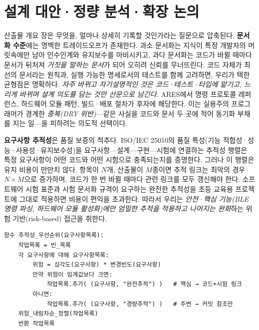 \section{설계 대안·정량 분석·확장 논의}

산출물 개요 장은 무엇을, 얼마나 상세히 기록할 것인가라는 질문으로 압축된다. \textbf{문서화 수준}에는 명백한 트레이드오프가 존재한다. 과소 문서화는 지식이 특정 개발자의 머릿속에만 남아 인수인계와 유지보수를 마비시키고, 과다 문서화는 코드가 바뀔 때마다 문서가 뒤처져 \emph{거짓을 말하는 문서}가 되어 오히려 신뢰를 무너뜨린다\cite{mcconnell2004codecomplete}. 코드 자체가 최선의 문서라는 원칙\cite{martin2008cleancode}과, 실행 가능한 명세로서의 테스트\cite{beck2003tdd}를 함께 고려하면, 우리가 택한 균형점은 명확하다. \emph{자주 바뀌고 자기설명적인 것은 코드·테스트·타입에 맡기고, 느리게 바뀌며 설계 의도를 담는 것만 산문으로 남긴다.} ARES에서 명령 프로토콜 레퍼런스\cite{ares-repo}, 하드웨어 모듈 패턴, 빌드·배포 절차가 후자에 해당한다. 이는 실용주의 프로그래머\cite{hunt1999pragmatic}가 경계한 \emph{중복(DRY 위반)}—같은 사실을 코드와 문서 두 곳에 적어 동기화 부채를 지는 일—을 피하려는 의도적 선택이다.

\textbf{요구사항 추적성}은 품질 보증의 척추다. ISO/IEC 25010\cite{iso25010}의 품질 특성(기능 적합성·성능·사용성·유지보수성)을 요구사항—설계—구현—시험에 연결하는 추적성 행렬은 특정 요구사항이 어떤 코드와 어떤 시험으로 충족되는지를 증명한다. 그러나 이 행렬은 유지 비용이 만만치 않다. 항목이 $N$개, 산출물이 $M$종이면 추적 링크는 최악의 경우 $N \times M$으로 증가하며, 코드가 한 번 바뀔 때마다 관련 링크를 모두 갱신해야 한다. 소프트웨어 시험 표준\cite{iso29119}과 시험 문서화 규격\cite{ieee829}이 요구하는 완전한 추적성을 초등 교육용 프로젝트에 그대로 적용하면 비용이 편익을 초과한다. 따라서 우리는 \emph{안전·핵심 기능(BLE 명령 파싱, 하드웨어 모듈 활성화)에만 엄밀한 추적을 적용하고 나머지는 완화}하는 위험 기반(risk-based) 접근을 취한다.

\begin{verbatim}
함수 추적성_우선순위(요구사항목록):
    작업목록 = 빈_목록
    각 요구사항에 대해 요구사항목록:
        위험 = 심각도(요구사항) * 변경빈도(요구사항)
        만약 위험이 임계값보다 크면:
            작업목록.추가( (요구사항, "완전추적") )   # 핵심 → 코드+시험 링크
        아니면:
            작업목록.추가( (요구사항, "경량추적") )   # 주변 → 커밋 참조만
    위험_내림차순_정렬(작업목록)
    반환 작업목록
\end{verbatim}


